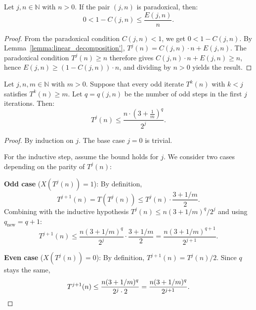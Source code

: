 \begin{lemma}\label{lemma:isParadoxical_bound}\leanok
Let $j, n \in \mathbb{N}$ with $n > 0$. If the pair $(j, n)$ is paradoxical, then:
\begin{equation}
    0 < 1 - C(j, n) \le \frac{E(j, n)}{n}.
\end{equation}
\end{lemma}
\begin{proof}\leanok
From the paradoxical condition $C(j, n) < 1$, we get $0 < 1 - C(j, n)$.
By Lemma~\ref{lemma:linear_decomposition'}, $T^j(n) = C(j, n) \cdot n + E(j, n)$.
The paradoxical condition $T^j(n) \ge n$ therefore gives $C(j,n) \cdot n + E(j,n) \ge n$,
hence $E(j,n) \ge (1 - C(j,n)) \cdot n$, and dividing by $n > 0$ yields the result.
\end{proof}

\begin{lemma}\label{lemma:odd_iter_bound_theorem_4_1}\leanok
Let $j, n, m \in \mathbb{N}$ with $m > 0$. Suppose that every odd iterate $T^k(n)$ with $k < j$ satisfies $T^k(n) \ge m$. Let $q = \mathit{q}(j, n)$ be the number of odd steps in the first $j$ iterations. Then:
\begin{equation}
    T^j(n) \le \frac{n \cdot \left(3 + \frac{1}{m}\right)^q}{2^j}.
\end{equation}
\end{lemma}
\begin{proof}\leanok
By induction on $j$. The base case $j = 0$ is trivial.

For the inductive step, assume the bound holds for $j$. We consider two cases depending on the parity of $T^j(n)$:

\textbf{Odd case} ($X(T^j(n)) = 1$): By definition,
\begin{equation}
    T^{j+1}(n) = T(T^j(n)) \le T^j(n) \cdot \frac{3 + 1/m}{2}.
\end{equation}
Combining with the inductive hypothesis $T^j(n) \le n(3 + 1/m)^q/2^j$ and using $q_{\text{new}} = q + 1$:
\begin{equation}
    T^{j+1}(n) \le \frac{n(3+1/m)^q}{2^j} \cdot \frac{3+1/m}{2} = \frac{n(3+1/m)^{q+1}}{2^{j+1}}.
\end{equation}

\textbf{Even case} ($X(T^j(n)) = 0$): By definition, $T^{j+1}(n) = T^j(n)/2$. Since $q$ stays the same,
\begin{equation}
    T^{j+1}(n) \le \frac{n(3+1/m)^q}{2^j \cdot 2} = \frac{n(3+1/m)^q}{2^{j+1}}. \qedhere
\end{equation}
\end{proof}

